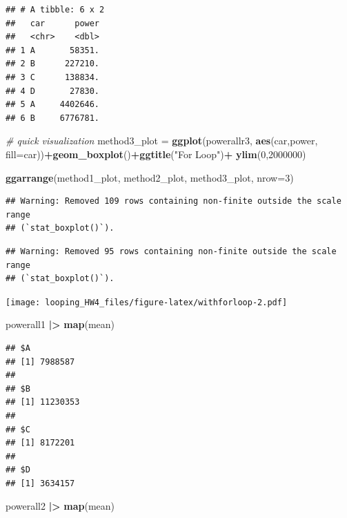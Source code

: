 \documentclass[
]{article}
\newenvironment{Shaded}{\begin{snugshade}}{\end{snugshade}}
\newcommand{\AttributeTok}[1]{\textcolor[rgb]{0.13,0.29,0.53}{#1}}
\newcommand{\CommentTok}[1]{\textcolor[rgb]{0.56,0.35,0.01}{\textit{#1}}}
\newcommand{\DecValTok}[1]{\textcolor[rgb]{0.00,0.00,0.81}{#1}}
\newcommand{\FunctionTok}[1]{\textcolor[rgb]{0.13,0.29,0.53}{\textbf{#1}}}
\newcommand{\NormalTok}[1]{#1}
\newcommand{\OtherTok}[1]{\textcolor[rgb]{0.56,0.35,0.01}{#1}}
\newcommand{\SpecialCharTok}[1]{\textcolor[rgb]{0.81,0.36,0.00}{\textbf{#1}}}
\newcommand{\StringTok}[1]{\textcolor[rgb]{0.31,0.60,0.02}{#1}}
\begin{document}
\begin{verbatim}
## # A tibble: 6 x 2
##   car      power
##   <chr>    <dbl>
## 1 A       58351.
## 2 B      227210.
## 3 C      138834.
## 4 D       27830.
## 5 A     4402646.
## 6 B     6776781.
\end{verbatim}

\begin{Shaded}
\begin{Highlighting}[]
\CommentTok{\# quick visualization}
\NormalTok{method3\_plot }\OtherTok{=} \FunctionTok{ggplot}\NormalTok{(powerallr3, }\FunctionTok{aes}\NormalTok{(car,power, }\AttributeTok{fill=}\NormalTok{car))}\SpecialCharTok{+}\FunctionTok{geom\_boxplot}\NormalTok{()}\SpecialCharTok{+}\FunctionTok{ggtitle}\NormalTok{(}\StringTok{"For Loop"}\NormalTok{)}\SpecialCharTok{+}
    \FunctionTok{ylim}\NormalTok{(}\DecValTok{0}\NormalTok{,}\DecValTok{2000000}\NormalTok{)}

\FunctionTok{ggarrange}\NormalTok{(method1\_plot, method2\_plot, method3\_plot, }\AttributeTok{nrow=}\DecValTok{3}\NormalTok{)}
\end{Highlighting}
\end{Shaded}

\begin{verbatim}
## Warning: Removed 109 rows containing non-finite outside the scale range
## (`stat_boxplot()`).
\end{verbatim}

\begin{verbatim}
## Warning: Removed 95 rows containing non-finite outside the scale range
## (`stat_boxplot()`).
\end{verbatim}

\texttt{[image: looping\_HW4\_files/figure-latex/withforloop-2.pdf]}

\begin{Shaded}
\begin{Highlighting}[]
\NormalTok{powerall1 }\SpecialCharTok{|\textgreater{}} \FunctionTok{map}\NormalTok{(mean)}
\end{Highlighting}
\end{Shaded}

\begin{verbatim}
## $A
## [1] 7988587
## 
## $B
## [1] 11230353
## 
## $C
## [1] 8172201
## 
## $D
## [1] 3634157
\end{verbatim}

\begin{Shaded}
\begin{Highlighting}[]
\NormalTok{powerall2 }\SpecialCharTok{|\textgreater{}} \FunctionTok{map}\NormalTok{(mean)}
\end{Highlighting}
\end{Shaded}
\end{document}
